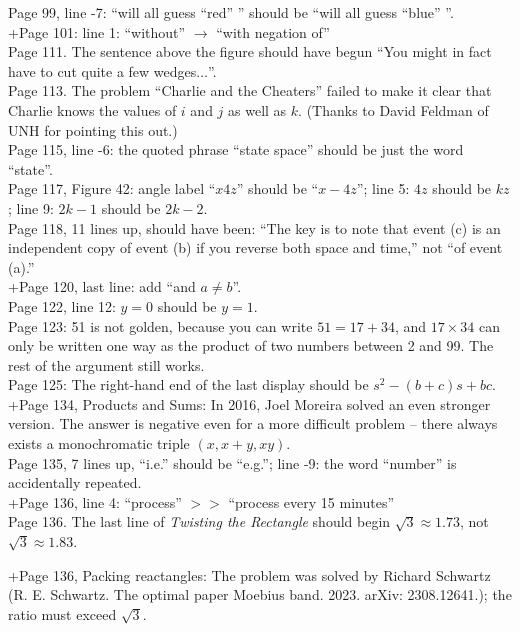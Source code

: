 \documentclass[11pt]{article}
\begin{document}
Page 99, line -7: ``will all guess ``red'' '' should be ``will all guess ``blue'' ''. \\

+Page 101: line 1: ``without'' $\to$ ``with negation of''\\

Page 111. The sentence above the figure should have begun ``You might in fact have to
cut quite a few wedges$\dots$''.\\

Page 113. The problem ``Charlie and the Cheaters'' failed to make it clear that Charlie knows
the values of $i$ and $j$ as well as $k$.  (Thanks to David Feldman of UNH for pointing this out.) \\

Page 115, line -6: the quoted phrase ``state space'' should be just the word ``state''. \\

Page 117, Figure 42: angle label ``$x4z$'' should be ``$x-4z$''; line 5: $4z$ should be $kz$;
line 9: $2k{-}1$ should be $2k{-}2$.\\

Page 118, 11 lines up, should have been: ``The key is to note that event (c) is an independent copy of event (b) if you reverse
both space and time,'' not ``of event (a).''\\

+Page 120, last line: add ``and $a\ne b$''.\\

Page 122, line 12: $y=0$ should be $y=1$.\\

Page 123: 51 is not golden, because you can write $51=17+34$, and $17 \times 34$ can only be written one
way as the product of two numbers between 2 and 99.  The rest of the argument still works.\\

Page 125: The right-hand end of the last display should be $s^2-(b+c)s+bc$.\\

+Page 134, Products and Sums: In 2016, Joel Moreira solved an even stronger version. The answer is negative even for a more difficult problem – there always exists a monochromatic triple $ (x, x + y, xy)$.\\

Page 135, 7 lines up,  ``i.e.'' should be ``e.g.'';
line -9: the word ``number'' is accidentally repeated.\\

+Page 136, line 4: ``process'' $>>$ ``process every 15 minutes''\\

Page 136. The last line of {\em Twisting the Rectangle} should begin $\sqrt{3}\approx 1.73$, not
$\sqrt{3}\approx 1.83$.

+Page 136, Packing reactangles: The problem was solved by Richard Schwartz (R. E. Schwartz. The optimal paper Moebius band. 2023. arXiv: 2308.12641.); the ratio must exceed $\sqrt{3}$.\\
\end{document}
